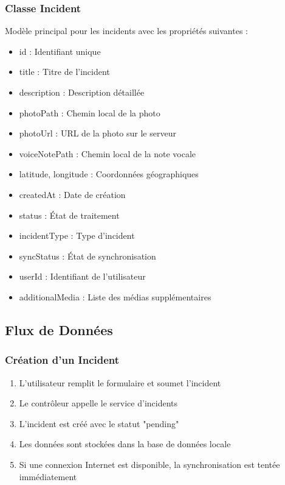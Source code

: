\documentclass[12pt,a4paper]{article}
\begin{document}
\subsubsection{Classe Incident}
Modèle principal pour les incidents avec les propriétés suivantes :
\begin{itemize}
    \item id : Identifiant unique
    \item title : Titre de l'incident
    \item description : Description détaillée
    \item photoPath : Chemin local de la photo
    \item photoUrl : URL de la photo sur le serveur
    \item voiceNotePath : Chemin local de la note vocale
    \item latitude, longitude : Coordonnées géographiques
    \item createdAt : Date de création
    \item status : État de traitement
    \item incidentType : Type d'incident
    \item syncStatus : État de synchronisation
    \item userId : Identifiant de l'utilisateur
    \item additionalMedia : Liste des médias supplémentaires
\end{itemize}

\subsection{Flux de Données}

\subsubsection{Création d'un Incident}
\begin{enumerate}
    \item L'utilisateur remplit le formulaire et soumet l'incident
    \item Le contrôleur appelle le service d'incidents
    \item L'incident est créé avec le statut "pending"
    \item Les données sont stockées dans la base de données locale
    \item Si une connexion Internet est disponible, la synchronisation est tentée immédiatement
\end{enumerate}
\end{document}
